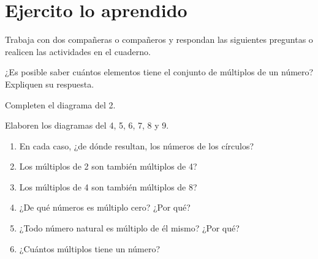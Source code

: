 \documentclass[10pt,twoside]{article}
\begin{document}
\section*{Ejercito lo aprendido}
Trabaja con dos compañeras o compañeros y respondan las siguientes preguntas o realicen las actividades en el cuaderno.
\begin{enumerate}
\item ¿Es posible saber cuántos elementos tiene el conjunto de múltiplos de un número? Expliquen su respuesta.

\begin{minipage}{.3\textwidth}
\item Completen el diagrama del 2.
\end{minipage}\hfill
\begin{minipage}{.65\textwidth}
\end{minipage}
\item Elaboren los diagramas del 4, 5, 6, 7, 8 y 9.
\begin{enumerate}
\item En cada caso, ¿de dónde resultan, los números de los
círculos?
\item Los múltiplos de 2 son también múltiplos de 4?
\item Los múltiplos de 4 son también múltiplos de 8?
\item ¿De qué números es múltiplo cero? ¿Por qué?
\item ¿Todo número natural es múltiplo de él mismo? ¿Por qué?
\item ¿Cuántos múltiplos tiene un número?
\end{enumerate}
\end{enumerate}
\end{document}
